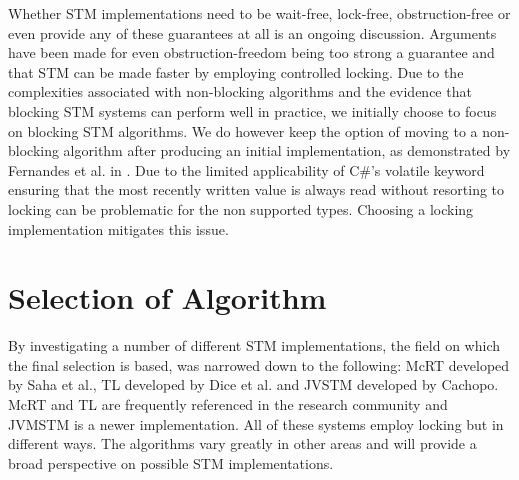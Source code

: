 Whether \ac{STM} implementations need to be wait-free, lock-free, obstruction-free or even provide any of these guarantees at all is an ongoing discussion. Arguments have been made for even obstruction-freedom being too strong a guarantee and that \ac{STM} can be made faster by employing controlled locking\cite{ennals2006software}. Due to the complexities associated with non-blocking algorithms\cite{al2013nonblocking}\cite[p. 61]{herlihy2012art} and the evidence that blocking \ac{STM} systems can perform well in practice, we initially choose to focus on blocking \ac{STM} algorithms. We do however keep the option of moving to a non-blocking algorithm after producing an initial implementation, as demonstrated by Fernandes et al. in \cite{fernandes2011lock}. Due to the limited applicability of C\#'s volatile keyword\cite[p. 302]{csharp2013specificaiton} ensuring that the most recently written value is always read without resorting to locking can be problematic for the non supported types. Choosing a locking implementation mitigates this issue.



\section{Selection of Algorithm}

By investigating a number of different \ac{STM} implementations, the field on which the final selection is based, was narrowed down to the following: McRT\cite{saha2006mcrt} developed by Saha et al., TL\cite{dice2006transactional} developed by Dice et al. and JVSTM\cite{cachopo2007development} developed by Cachopo. McRT and TL are frequently referenced in the research community and JVMSTM is a newer implementation. All of these systems employ locking but in different ways. The algorithms vary greatly in other areas and will provide a broad perspective on possible \ac{STM} implementations.

